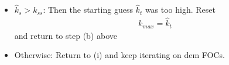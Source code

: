 \documentclass[12pt]{article}
\theoremstyle{plain}
\theoremstyle{definition}
\theoremstyle{remark}
\begin{document}
\begin{enumerate}
\begin{enumerate}
\begin{enumerate}
\begin{itemize}
              \item $\hat{k}_s>k_{ss}$: Then the starting guess
                $\hat{k}_t$ was too high. Reset
                \begin{align*}
                  k_{max} = \hat{k}_t
                \end{align*}
                and return to step (b) above

              \item Otherwise: Return to (i) and keep iterating on dem
                FOCs.
            \end{itemize}

        \end{enumerate}
    \end{enumerate}

\end{enumerate}




\end{document}
